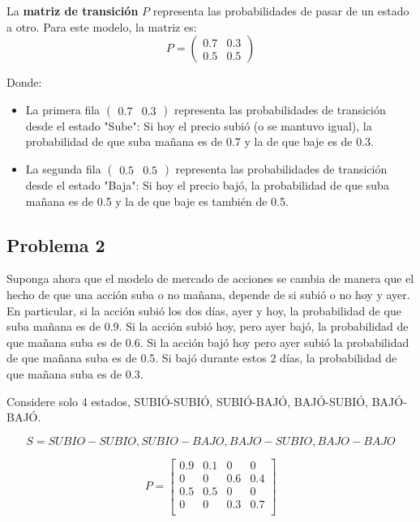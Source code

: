 \documentclass{article}
\begin{document}
La \textbf{matriz de transición} \( P \) representa las probabilidades de pasar de un estado a otro. Para este modelo, la matriz es:
\[ P = \begin{pmatrix} 0.7 & 0.3 \\ 0.5 & 0.5 \end{pmatrix} \]

Donde:
\begin{itemize}
    \item La primera fila \( \begin{pmatrix} 0.7 & 0.3 \end{pmatrix} \) representa las probabilidades de transición desde el estado "Sube": Si hoy el precio subió (o se mantuvo igual), la probabilidad de que suba mañana es de 0.7 y la de que baje es de 0.3.
    \item La segunda fila \( \begin{pmatrix} 0.5 & 0.5 \end{pmatrix} \) representa las probabilidades de transición desde el estado "Baja": Si hoy el precio bajó, la probabilidad de que suba mañana es de 0.5 y la de que baje es también de 0.5.
\end{itemize}

\subsection{Problema 2}

Suponga ahora que el modelo de mercado de acciones se cambia de manera que el hecho de que una acción suba o no mañana, depende de si subió o no hoy y ayer. En particular, si la acción subió los dos días, ayer y hoy, la probabilidad de que suba mañana es de 0.9. Si la acción subió hoy, pero ayer bajó, la probabilidad de que mañana suba es de 0.6. Si la acción bajó hoy pero ayer subió la probabilidad de que mañana suba es de 0.5. Si bajó durante estos 2 días, la probabilidad de que mañana suba es de 0.3.

Considere solo 4 estados, SUBIÓ-SUBIÓ, SUBIÓ-BAJÓ, BAJÓ-SUBIÓ, BAJÓ-BAJÓ.

\[S={SUBIO-SUBIO,SUBIO-BAJO,BAJO-SUBIO,BAJO-BAJO}\]

\[
    P = \begin{bmatrix}
        0.9 & 0.1 & 0   & 0   \\
        0   & 0   & 0.6 & 0.4 \\
        0.5 & 0.5 & 0   & 0   \\
        0   & 0   & 0.3 & 0.7 \\
    \end{bmatrix}
\]
\end{document}
